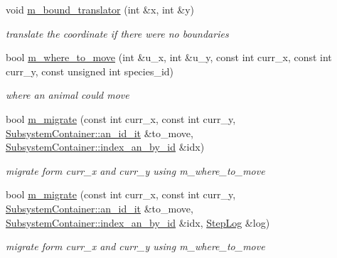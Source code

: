 \begin{DoxyCompactItemize}
void \hyperlink{classEcosystemContainer_a18d6b66ba403b00cbb3069bfcc2a72d6}{m\_\-bound\_\-translator} (int \&x, int \&y)
\begin{DoxyCompactList}\small\item\em translate the coordinate if there were no boundaries \end{DoxyCompactList}\item 
bool \hyperlink{classEcosystemContainer_a1f17cee83b62c0b3a088701011a09f0d}{m\_\-where\_\-to\_\-move} (int \&u\_\-x, int \&u\_\-y, const int curr\_\-x, const int curr\_\-y, const unsigned int species\_\-id)
\begin{DoxyCompactList}\small\item\em where an animal could move \end{DoxyCompactList}\item 
bool \hyperlink{classEcosystemContainer_af1b88c429ba4807eaa02c1c958a8037c}{m\_\-migrate} (const int curr\_\-x, const int curr\_\-y, \hyperlink{classSubsystemContainer_a016775688f9d4baed66e8bdc3fbc0ec9}{SubsystemContainer::an\_\-id\_\-it} \&to\_\-move, \hyperlink{classSubsystemContainer_ae095d19ad8aee4e1f1620166f440cf99}{SubsystemContainer::index\_\-an\_\-by\_\-id} \&idx)
\begin{DoxyCompactList}\small\item\em migrate form curr\_\-x and curr\_\-y using m\_\-where\_\-to\_\-move \end{DoxyCompactList}\item 
bool \hyperlink{classEcosystemContainer_af383cbfff979511fa2d88776d5058185}{m\_\-migrate} (const int curr\_\-x, const int curr\_\-y, \hyperlink{classSubsystemContainer_a016775688f9d4baed66e8bdc3fbc0ec9}{SubsystemContainer::an\_\-id\_\-it} \&to\_\-move, \hyperlink{classSubsystemContainer_ae095d19ad8aee4e1f1620166f440cf99}{SubsystemContainer::index\_\-an\_\-by\_\-id} \&idx, \hyperlink{structStepLog}{StepLog} \&log)
\begin{DoxyCompactList}\small\item\em migrate form curr\_\-x and curr\_\-y using m\_\-where\_\-to\_\-move \end{DoxyCompactList}\end{DoxyCompactItemize}
